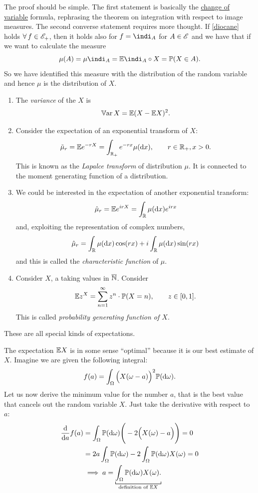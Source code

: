 \documentclass{report}
\begin{document}
\begin{fancyproof}
	The proof should be simple. The first statement is basically the \hyperref[eh]{change of variable} formula, rephrasing the theorem on integration with respect to image measures.
	The second converse statement requires more thought. If \ref{diocane} holds $\forall\, f\in\mathscr{E}_+$, then it holds also for $f=\indi_A$ for $A\in\mathscr{E}$ and we have that if we want to calculate the measure 
	\[\mu(A)=\mu\indi_A=\ev\indi_A\circ X=\pr(X\in A).\]
	So we have identified this measure with the distribution of the random variable and hence $\mu$ is the distribution of $X$.
\end{fancyproof}
\begin{example}
	\begin{enumerate}[\circnum]
		\item The \emph{variance} of the \rv{} $X$ is
		\[\mathbb{V}\mathrm{ar}\, X=\mathbb{E}(X-\mathbb{E} X)^2.\]
		\item Consider the expectation of an exponential transform of $X$:
		\[\tilde{\mu}_r=\mathbb{E} e^{-rX}=\int_{\mathbb{R}_+}e^{-rx}\mu(\mathop{}\!\mathrm{d} x),\qquad r\in\mathbb{R}_+,x>0.\]
		This is known as the \emph{Lapalce transform} of distribution $\mu$. It is connected to the moment generating function of a distribution.
		\item We could be interested in the expectation of another exponential transform:
		\[\hat{\mu}_r=\mathbb{E} e^{irX}=\int_{\mathbb{R}}\mu(\mathop{}\!\mathrm{d} x)e^{irx}\]
		and, exploiting the representation of complex numbers,
		\[\hat{\mu}_r=\int_{\mathbb{R}}\mu(\mathop{}\!\mathrm{d} x)\cos(rx)+i\int_{\mathbb{R}}\mu(\mathop{}\!\mathrm{d} x)\sin(rx)\]
		and this is called the \emph{characteristic function} of $\mu$.
		\item Consider $X$, a \rv{} taking values in $\overline{\mathbb{N}}$. Consider
		\[\mathbb{E} z^X=\sum_{n=1}^{\infty}z^n\cdot\mathbb{P}(X=n),\qquad z\in[0,1].\]
		This is called \emph{probability generating function of $X$}.
	\end{enumerate}
	These are all special kinds of expectations.
\end{example}
\begin{remark}
	The expectation $\mathbb{E} X$ is in some sense ``optimal'' because it is our best estimate of $X$. Imagine we are given the following integral:
	\[f(a)=\int_\Omega \Big(X(\omega-a)\Big)^2\mathbb{P}(\mathop{}\!\mathrm{d}\omega).\]
	Let us now derive the minimum value for the number $a$, that is the best value that cancels out the random variable $X$. Just take the derivative with respect to $a$:
	\begin{align*}
		\frac{\dif}{\dif a}f(a)&=\int_\Omega\pr(\dw)\Bigg(-2\Big(X(\omega)-a\Big)\Bigg)=0\\
		&=2a\int_\Omega\pr(\dw)-2\int_\Omega\pr(\dw)X(\omega)=0\\
		&\implies a= \underbracket[0.6pt]{\int_\Omega\pr(\dw)X(\omega).}_{\mathclap{\text{definition of }\ev X}}
	\end{align*}
\end{remark}
\end{document}
